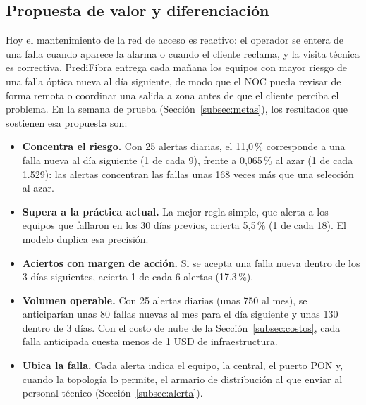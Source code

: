 \documentclass[12pt,a4paper]{article}
\begin{document}
\subsection{Propuesta de valor y diferenciación}
\label{subsec:valor}
\noindent
Hoy el mantenimiento de la red de acceso es reactivo: el operador se entera de una falla cuando aparece la alarma o cuando el cliente reclama, y la visita técnica es correctiva. PrediFibra entrega cada mañana los equipos con mayor riesgo de una falla óptica nueva al día siguiente, de modo que el NOC pueda revisar de forma remota o coordinar una salida a zona antes de que el cliente perciba el problema. En la semana de prueba (Sección~\ref{subsec:metas}), los resultados que sostienen esa propuesta son:
\begin{itemize}
    \item \textbf{Concentra el riesgo.} Con 25 alertas diarias, el 11,0\,\% corresponde a una falla nueva al día siguiente (1 de cada 9), frente a 0,065\,\% al azar (1 de cada 1.529): las alertas concentran las fallas unas 168 veces más que una selección al azar.
    \item \textbf{Supera a la práctica actual.} La mejor regla simple, que alerta a los equipos que fallaron en los 30 días previos, acierta 5,5\,\% (1 de cada 18). El modelo duplica esa precisión.
    \item \textbf{Aciertos con margen de acción.} Si se acepta una falla nueva dentro de los 3 días siguientes, acierta 1 de cada 6 alertas (17,3\,\%).
    \item \textbf{Volumen operable.} Con 25 alertas diarias (unas 750 al mes), se anticiparían unas 80 fallas nuevas al mes para el día siguiente y unas 130 dentro de 3 días. Con el costo de nube de la Sección~\ref{subsec:costos}, cada falla anticipada cuesta menos de 1 USD de infraestructura.
    \item \textbf{Ubica la falla.} Cada alerta indica el equipo, la central, el puerto PON y, cuando la topología lo permite, el armario de distribución al que enviar al personal técnico (Sección~\ref{subsec:alerta}).
\end{itemize}
\end{document}

